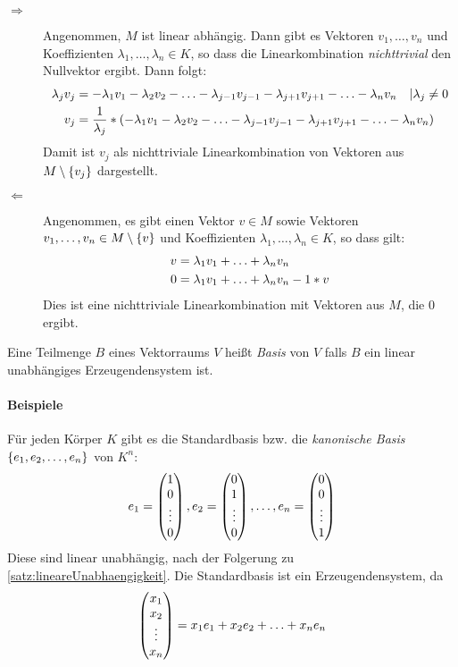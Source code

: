 \begin{description}
  \newcommand{\lv}[1]{\ensuremath\lambda_{#1}v_{#1}}
  \item[\glqq$\Rightarrow$\grqq] Angenommen, $M$ ist linear abhängig. Dann gibt es Vektoren $v_1,\ldots,v_n$ und Koeffizienten $\lambda_1,\ldots,\lambda_n \in K$, so dass die Linearkombination \emph{nichttrivial} den Nullvektor ergibt. Dann folgt:
  \begin{align*}
    \lv{j} &= -\lv{1}-\lv{2}-\ldots-\lv{j-1}-\lv{j+1}-\ldots-\lv{n} \quad |\lambda_j\neq0\\
    v_j &= \frac{1}{\lambda_j} * \left( -\lv{1}-\lv{2}-\ldots-\lv{j-1}-\lv{j+1}-\ldots-\lv{n} \right)
  \end{align*}
  Damit ist $v_j$ als nichttriviale Linearkombination von Vektoren aus $M\setminus\left\{ v_j \right\}$ dargestellt.


  \item[\glqq$\Leftarrow$\grqq] Angenommen, es gibt einen Vektor $v\in M$ sowie Vektoren $v_1,\ldots,v_n\in M\setminus\left\{ v \right\}$ und Koeffizienten $\lambda_1,\ldots,\lambda_n \in K$, so dass gilt:
  \begin{align*}
    v &= \lv{1}+\ldots+\lv{n}\\
    0 &= \lv{1}+\ldots+\lv{n} - 1*v
  \end{align*}
  Dies ist eine nichttriviale Linearkombination mit Vektoren aus $M$, die $0$ ergibt.
\end{description}


Eine Teilmenge $B$ eines Vektorraums $V$ heißt \emph{Basis} von $V$ falls $B$ ein linear unabhängiges Erzeugendensystem ist.

\paragraph{Beispiele}
Für jeden Körper $K$ gibt es die Standardbasis bzw. die \emph{kanonische Basis} $\left\{ e_1,e_2,\ldots,e_n \right\}$ von $K^n$:
\begin{equation*}
  e_1=\begin{pmatrix} 1\\0\\\vdots\\ 0 \end{pmatrix}, e_2=\begin{pmatrix} 0\\1\\\vdots\\ 0 \end{pmatrix}, \ldots, e_n=\begin{pmatrix} 0\\0\\\vdots\\ 1 \end{pmatrix}
\end{equation*}
Diese sind linear unabhängig, nach der Folgerung zu \autoref{satz:lineareUnabhaengigkeit}. Die Standardbasis ist ein Erzeugendensystem, da
\begin{equation*}
  \begin{pmatrix} x_1\\x_2\\\vdots\\x_n \end{pmatrix}=x_1e_1+x_2e_2+\ldots+x_ne_n
\end{equation*}

